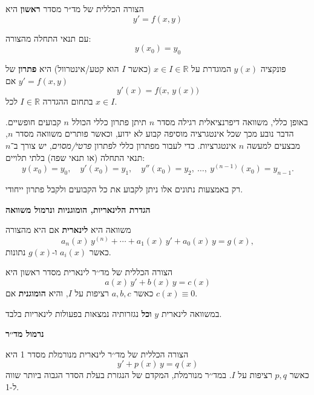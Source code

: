 \documentclass{article}
\numberwithin{equation}{section}
\begin{document}
הצורה הכללית של מד״ר מסדר \textbf{ראשון} היא
\begin{equation}
y' = f(x,y)
\end{equation}

\noindent עם תנאי התחלה מהצורה:
\begin{equation}
y(x_{0}) = y_{0}
\end{equation}

\noindent פונקציה \( y(x) \) המוגדרת על \( x \in I \in \mathbb{R}
 \) (כאשר \( I \) הוא קטע/אינטרוול)
היא \textbf{פתרון} של \( y' = f(x,y) \) אם
\begin{equation}
y'(x) = f\big(x,\,y(x)\big)
\end{equation}
בתחום ההגדרה \( I\in \mathbb{R} \) לכל \( x \in I \).

באופן כללי, משוואה דיפרנציאלית רגילה מסדר $n$ תיתן פתרון כללי הכולל $n$ קבועים חופשיים. הדבר נובע מכך שכל אינטגרציה מוסיפה קבוע לא ידוע, וכאשר פותרים משוואה מסדר $n$, מבצעים למעשה $n$ אינטגרציות. כדי לעבור מפתרון כללי לפתרון \emph{פרטי/מסוים}, יש צורך ב־$n$ תנאי התחלה (או תנאי שפה) בלתי תלויים:
\[
y(x_0) = y_0, \quad y'(x_0) = y_1, \quad y''(x_0) = y_2, \ \ldots, \ y^{(n-1)}(x_0) = y_{n-1}.
\]

רק באמצעות נתונים אלו ניתן לקבוע את כל הקבועים ולקבל פתרון ייחודי.

\vspace{0.5cm}

\textbf{הגדרת הלינאריות, הומוגניות ונרמול משוואה}


משוואה היא \textbf{לינארית} אם היא מהצורה
\begin{equation}
a_n(x)\,y^{(n)}+\cdots+a_1(x)\,y'+a_0(x)\,y = g(x),
\end{equation}
כאשר $a_i(x)$ ו-$g(x)$ נתונות.

הצורה הכללית של מד׳׳ר לינארית מסדר ראשון היא
\begin{equation}
a(x)\,y' + b(x)\,y = c(x)
\end{equation}
כאשר $a,b,c$ רציפות על $I$, והיא \textbf{הומוגנית} אם $c(x)\equiv 0$.

במשוואה לינארית $y$ \textbf{וכל} נגזרותיה נמצאות בפעולות לינאריות בלבד.

\vspace{0.5cm}

\textbf{נרמול מד׳׳ר}

הצורה הכללית של מד׳׳ר לינארית מנורמלת מסדר 1 היא
\begin{equation}
y' + p(x)\,y = q(x)
\end{equation}
כאשר $p,q$ רציפות על $I$.
במד׳׳ר מנורמלת, המקדם של הנגזרת בעלת הסדר הגבוה ביותר שווה ל-1.
\end{document}
